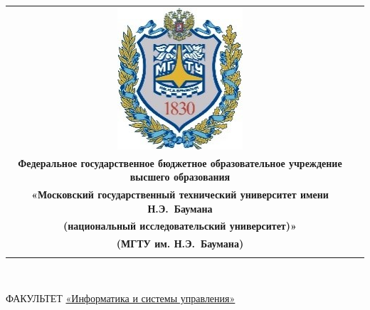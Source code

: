 \begin{titlepage}
\noindent
\begin{tabular}{cc}
\noindent
\begin{minipage}{0.14\textwidth}
\includegraphics[width=\linewidth]{img/b_logo}
\end{minipage} &
\noindent
\begin{minipage}{0.8\textwidth}\centering
\textbf{\newline Министерство науки и высшего образования Российской Федерации}\\
\textbf{Федеральное государственное бюджетное образовательное учреждение высшего образования}\\
\textbf{«Московский государственный технический университет имени Н.Э.~Баумана}\\
\textbf{(национальный исследовательский университет)»}\\
\textbf{(МГТУ им. Н.Э.~Баумана)}
\end{minipage} \\
\Xhline{8\arrayrulewidth}
\end{tabular}

\

\noindent ФАКУЛЬТЕТ \underline{«Информатика и системы управления»}


\end{titlepage}
